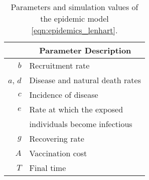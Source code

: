 \begin{table}[H]
  \begin{center}
    \begin{tabular}{rl}
      \toprule
        & \multicolumn{1}{c}{\textbf{Parameter Description}} 
        \\
      \midrule
        $b$
          & Recruitment rate
        \\
        $a$, $d$ 
          & Disease and natural death rates
        \\
        $c$
          & Incidence of disease
        \\
        $e$
          & Rate at which the exposed 
          \\
          & individuals become infectious
        \\
        $g$
          & Recovering rate
        \\
        $A$
          & Vaccination cost
        \\
        $T$
          & Final time
        \\
      \bottomrule
    \end{tabular}
    \caption{Parameters and simulation values of the epidemic model
      \eqref{eqn:epidemics_lenhart}.}
    \label{tbl:epidemics_lenhart_des}
  \end{center}
\end{table}
%
